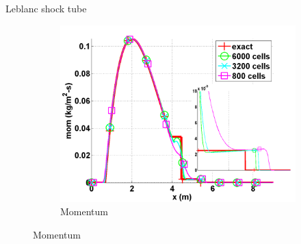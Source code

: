 \documentclass[xcolor=dvipsnames,10pt]{beamer}
\begin{document}
\begin{frame}{Leblanc shock tube}
\begin{figure}[H]
\begin{subfigure}[b]{0.37\textwidth}
                \includegraphics[width=\textwidth]{../figures/Leblanc_exact_and_numerical_stt_momentum_6000.png}
                \caption{Momentum}
                \label{fig:1d_leblanc_density}
        \end{subfigure}


\end{figure}
\end{frame}
\end{document}
